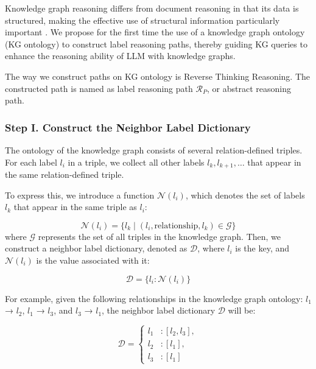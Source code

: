 Knowledge graph reasoning differs from document reasoning in that its data is structured, making the effective use of structural information particularly important \cite{Thambi2022TowardsIT}. We propose for the first time the use of a knowledge graph ontology (KG ontology) to construct label reasoning paths, thereby guiding KG queries to enhance the reasoning ability of LLM with knowledge graphs. 

The way we construct paths on KG ontology is Reverse Thinking Reasoning. The constructed path is named as label reasoning path \( \mathcal{R}_P \), or abstract reasoning path.

\subsubsection{Step I. Construct the Neighbor Label Dictionary}

The ontology of the knowledge graph consists of several relation-defined triples. For each label \( l_i \) in a triple, we collect all other labels \( l_k, l_{k+1}, \dots \) that appear in the same relation-defined triple.

To express this, we introduce a function \( \mathcal{N}(l_i) \), which denotes the set of labels \( l_k \) that appear in the same triple as \( l_i \):

\begin{equation}
\mathcal{N}(l_i) = \{ l_k \mid (l_i, \text{relationship}, l_k) \in \mathcal{G} \}
\end{equation}
where \( \mathcal{G} \) represents the set of all triples in the knowledge graph. Then, we construct a neighbor label dictionary, denoted as \( \mathcal{D} \), where \( l_i \) is the key, and \( \mathcal{N}(l_i) \) is the value associated with it:

\begin{equation}
\mathcal{D} = \{ l_i : \mathcal{N}(l_i) \}
\end{equation}

For example, given the following relationships in the knowledge graph ontology: \( l_1 \) → \( l_2 \), \( l_1 \) → \( l_3 \), and \( l_3 \) → \( l_1 \), the neighbor label dictionary \( \mathcal{D} \) will be:

\[
\mathcal{D} =
\left\{
\begin{array}{ll}
l_1 & : [l_2, l_3], \\
l_2 & : [l_1], \\
l_3 & : [l_1]
\end{array}
\right.
\]

